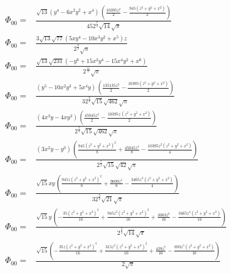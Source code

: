 \documentclass[10pt]{article}
\begin{document}
\begin{align*}
\Phi_{00} = &\frac{\sqrt{13} \left( {{y}^{4}}-6 {{x}^{2}} {{y}^{2}}+{{x}^{4}}\right) \, \left( \frac{10395 {{z}^{2}}}{2}-\frac{945 \left( {{z}^{2}}+{{y}^{2}}+{{x}^{2}}\right) }{2}\right) }{45 {{2}^{\frac{7}{2}}} \sqrt{14} \sqrt{\ensuremath{\pi} }}\\
\Phi_{00} = &\frac{3 \sqrt{13} \sqrt{77} \left( 5 x {{y}^{4}}-10 {{x}^{3}} {{y}^{2}}+{{x}^{5}}\right)  z}{{{2}^{\frac{9}{2}}} \sqrt{\ensuremath{\pi} }}\\
\Phi_{00} = &\frac{\sqrt{13} \sqrt{231} \left( -{{y}^{6}}+15 {{x}^{2}} {{y}^{4}}-15 {{x}^{4}} {{y}^{2}}+{{x}^{6}}\right) }{{{2}^{\frac{11}{2}}} \sqrt{\ensuremath{\pi} }}\\
%
\Phi_{00} = &\frac{\left( {{y}^{5}}-10 {{x}^{2}} {{y}^{3}}+5 {{x}^{4}} y\right) \, \left( \frac{135135 {{z}^{2}}}{2}-\frac{10395 \left( {{z}^{2}}+{{y}^{2}}+{{x}^{2}}\right) }{2}\right) }{3 {{2}^{\frac{9}{2}}} \sqrt{15} \sqrt{462} \sqrt{\ensuremath{\pi} }}\\
\Phi_{00} = &\frac{\left( 4 {{x}^{3}} y-4 x {{y}^{3}}\right) \, \left( \frac{45045 {{z}^{3}}}{2}-\frac{10395 z\, \left( {{z}^{2}}+{{y}^{2}}+{{x}^{2}}\right) }{2}\right) }{{{2}^{\frac{7}{2}}} \sqrt{15} \sqrt{462} \sqrt{\ensuremath{\pi} }}\\
\Phi_{00} = &\frac{\left( 3 {{x}^{2}} y-{{y}^{3}}\right) \, \left( \frac{945 {{\left( {{z}^{2}}+{{y}^{2}}+{{x}^{2}}\right) }^{2}}}{8}+\frac{45045 {{z}^{4}}}{8}-\frac{10395 {{z}^{2}} \left( {{z}^{2}}+{{y}^{2}}+{{x}^{2}}\right) }{4}\right) }{{{2}^{\frac{5}{2}}} \sqrt{15} \sqrt{42} \sqrt{\ensuremath{\pi} }}\\
\Phi_{00} = &\frac{\sqrt{15} x y\, \left( \frac{945 z {{\left( {{z}^{2}}+{{y}^{2}}+{{x}^{2}}\right) }^{2}}}{8}+\frac{9009 {{z}^{5}}}{8}-\frac{3465 {{z}^{3}} \left( {{z}^{2}}+{{y}^{2}}+{{x}^{2}}\right) }{4}\right) }{3 {{2}^{\frac{3}{2}}} \sqrt{21} \sqrt{\ensuremath{\pi} }}\\
\Phi_{00} = &\frac{\sqrt{15} y\, \left( -\frac{35 {{\left( {{z}^{2}}+{{y}^{2}}+{{x}^{2}}\right) }^{3}}}{16}+\frac{945 {{z}^{2}} {{\left( {{z}^{2}}+{{y}^{2}}+{{x}^{2}}\right) }^{2}}}{16}+\frac{3003 {{z}^{6}}}{16}-\frac{3465 {{z}^{4}} \left( {{z}^{2}}+{{y}^{2}}+{{x}^{2}}\right) }{16}\right) }{{{2}^{\frac{3}{2}}} \sqrt{14} \sqrt{\ensuremath{\pi} }}\\
\Phi_{00} = &\frac{\sqrt{15} \left( -\frac{35 z {{\left( {{z}^{2}}+{{y}^{2}}+{{x}^{2}}\right) }^{3}}}{16}+\frac{315 {{z}^{3}} {{\left( {{z}^{2}}+{{y}^{2}}+{{x}^{2}}\right) }^{2}}}{16}+\frac{429 {{z}^{7}}}{16}-\frac{693 {{z}^{5}} \left( {{z}^{2}}+{{y}^{2}}+{{x}^{2}}\right) }{16}\right) }{2 \sqrt{\ensuremath{\pi} }}\\

\end{align*}
\end{document}
